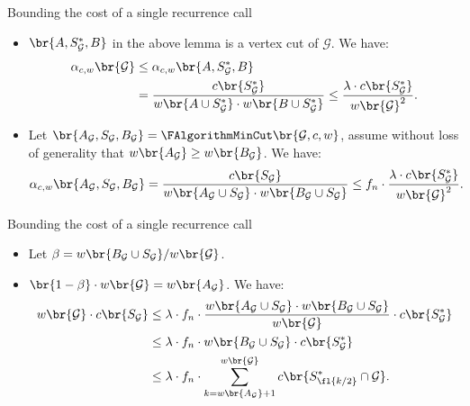 \begin{frame}{Bounding the cost of a single recurrence call}
\begin{itemize}
    \item $\br{A,S_{\mathcal{G}}^*,B}$ in the above lemma is a vertex cut of $\mathcal{G}$. We have:
    \pause
    \begin{align*}
    \alpha_{c,w}\br{\mathcal{G}}&\leq \alpha_{c,w}\br{A,S_{\mathcal{G}}^*,B}
    \\&=
    \frac{c\br{S_{\mathcal{G}}^*}}{w\br{A\cup S_{\mathcal{G}}^*}\cdot w\br{B\cup S_{\mathcal{G}}^*}}\leq \frac{\lambda\cdot c\br{S_{\mathcal{G}}^*}}{w\br{\mathcal{G}}^2}.   
    \end{align*}
    \pause
    \item Let $\br{A_{\mathcal{G}},S_{\mathcal{G}}, B_{\mathcal{G}}} = \FAlgorithmMinCut \br{\mathcal{G},c,w}$, assume without loss of generality that  $w\br{A_{\mathcal{G}}}\geq w\br{B_{\mathcal{G}}}$. We have:
    \pause
    $$
        \alpha_{c,w}\br{A_{\mathcal{G}},S_{\mathcal{G}}, B_{\mathcal{G}}}=\frac{c\br{S_{\mathcal{G}}}}{w\br{A_{\mathcal{G}}\cup S_{\mathcal{G}}}\cdot w\br{B_{\mathcal{G}}\cup S_{\mathcal{G}}}}\leq f_n \cdot \frac{\lambda\cdot c\br{S_{\mathcal{G}}^*}} {w\br{\mathcal{G}}^2}.
        $$
\end{itemize}
\end{frame}

\begin{frame}{Bounding the cost of a single recurrence call }
\begin{itemize}
    \item Let $\beta=w\br{B_{\mathcal{G}}\cup S_{\mathcal{G}}}/w\br{\mathcal{G}}$.
    \pause
    \item $\br{1-\beta}\cdot w\br{\mathcal{G}} = w\br{A_\mathcal{G}}$. We have:
    \begin{align*}
        w\br{\mathcal{G}}\cdot c\br{S_{\mathcal{G}}} &\leq \lambda \cdot f_n\cdot \frac{w\br{A_{\mathcal{G}}\cup S_{\mathcal{G}}}\cdot w\br{B_{\mathcal{G}}\cup S_{\mathcal{G}}}}{w\br{\mathcal{G}}}\cdot c\br{S_{\mathcal{G}}^*}\\
        & \leq 
        \lambda \cdot f_n\cdot w\br{B_{\mathcal{G}}\cup S_{\mathcal{G}}}\cdot c\br{S_{\mathcal{G}}^*} 
        \\&\leq 
        \lambda \cdot f_n\cdot \sum_{k=w\br{A_{\mathcal{G}}}+1}^{w\br{\mathcal{G}}}c\br{S_{\fl{k/2}}^*\cap \mathcal{G}}.
        \end{align*}
\end{itemize} 
\end{frame}


